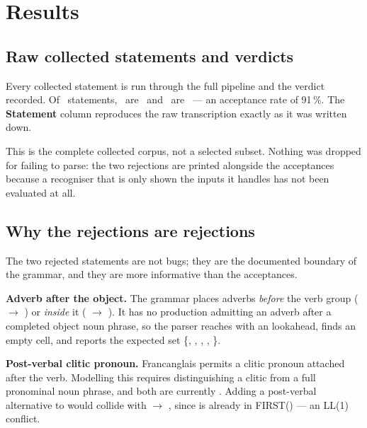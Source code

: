 \section{Results}\label{c:results}

\subsection{Raw collected statements and verdicts}

Every collected statement is run through the full pipeline and the verdict recorded. Of
\CorpusTotal\ statements, \CorpusAccepted\ are \accepted\ and \CorpusRejected\ are
\rejected\ --- an acceptance rate of 91\,\%. The \textbf{Statement} column reproduces the
raw transcription exactly as it was written down.



\begin{keypoint}
This is the complete collected corpus, not a selected subset. Nothing was dropped for
failing to parse: the two rejections are printed alongside the acceptances because a
recogniser that is only shown the inputs it handles has not been evaluated at all.
\end{keypoint}

\subsection{Why the rejections are rejections}

The two rejected statements are not bugs; they are the documented boundary of the grammar,
and they are more informative than the acceptances.

\textbf{Adverb after the object.} The grammar places adverbs \emph{before} the verb group
( $\rightarrow$  ) or \emph{inside} it
( $\rightarrow$  ). It has no production
admitting an adverb after a completed object noun phrase, so the parser reaches
 with an  lookahead, finds an empty cell, and reports the expected
set \{, , , , \}.

\textbf{Post-verbal clitic pronoun.} Francanglais permits a clitic pronoun attached after
the verb. Modelling this requires distinguishing a clitic from a full pronominal noun
phrase, and both are currently . Adding a post-verbal  alternative to
 would collide with  $\rightarrow$ 
, since  is already in FIRST() --- an LL(1) conflict.

